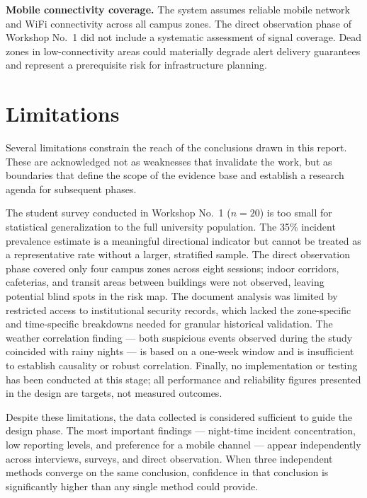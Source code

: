 \documentclass[12pt, oneside]{article}
\begin{document}
\textbf{Mobile connectivity coverage.} The system assumes reliable mobile network
and WiFi connectivity across all campus zones. The direct observation phase of
Workshop No.~1 did not include a systematic assessment of signal coverage. Dead
zones in low-connectivity areas could materially degrade alert delivery guarantees
and represent a prerequisite risk for infrastructure planning.

\section{Limitations}

Several limitations constrain the reach of the conclusions drawn in this report. These
are acknowledged not as weaknesses that invalidate the work, but as boundaries that
define the scope of the evidence base and establish a research agenda for subsequent
phases.

The student survey conducted in Workshop No.~1 ($n = 20$) is too small for statistical
generalization to the full university population. The 35\% incident prevalence estimate
is a meaningful directional indicator but cannot be treated as a representative rate
without a larger, stratified sample. The direct observation phase covered only four
campus zones across eight sessions; indoor corridors, cafeterias, and transit areas
between buildings were not observed, leaving potential blind spots in the risk map.
The document analysis was limited by restricted access to institutional security records,
which lacked the zone-specific and time-specific breakdowns needed for granular
historical validation. The weather correlation finding --- both suspicious events observed
during the study coincided with rainy nights --- is based on a one-week window and is
insufficient to establish causality or robust correlation. Finally, no implementation or
testing has been conducted at this stage; all performance and reliability figures presented
in the design are targets, not measured outcomes.

Despite these limitations, the data collected is considered sufficient to guide the design
phase. The most important findings --- night-time incident concentration, low reporting
levels, and preference for a mobile channel --- appear independently across interviews,
surveys, and direct observation. When three independent methods converge on the same
conclusion, confidence in that conclusion is significantly higher than any single method
could provide.
\end{document}
